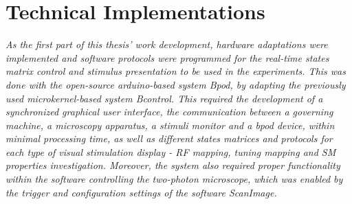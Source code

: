 
\chapter{Technical Implementations}
\label{cap:TechnicalImplementations}

\textit{As the first part of this thesis' work development, hardware adaptations were implemented and software protocols were programmed for the real-time states matrix control and stimulus presentation to be used in the experiments. This was done with the open-source arduino-based system Bpod, by adapting the previously used microkernel-based system Bcontrol. This required the development of a synchronized graphical user interface, the communication between a governing machine, a microscopy apparatus, a stimuli monitor and a bpod device, within minimal processing time, as well as different states matrices and protocols for each type of visual stimulation display - RF mapping, tuning mapping and SM properties investigation.
Moreover, the system also required proper functionality within the software controlling the two-photon microscope, which was enabled by the trigger and configuration settings of the software ScanImage.}




%
%
%
